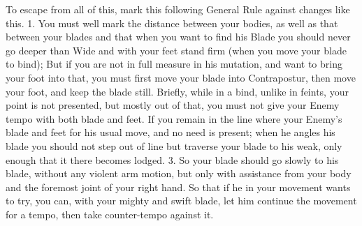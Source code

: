 To escape from all of this, mark this following General Rule against
changes like this. 1. You must well mark the distance between your
bodies, as well as that between your blades and that when you want to
find his Blade you should never go deeper than Wide and with your feet
stand firm (when you move your blade to bind); But if you are not in
full measure in his mutation, and want to bring your foot into that,
you must first move your blade into Contrapostur, then move your foot,
and keep the blade still. Briefly, while in a bind, unlike in feints,
your point is not presented, but mostly out of that, you must not give
your Enemy tempo with both blade and feet. If you remain in the line
where your Enemy's blade and feet for his usual move, and no need is
present; when he angles his blade you should not step out of line but
traverse your blade to his weak, only enough that it there becomes
lodged. 3. So your blade should go slowly to his blade, without any
violent arm motion, but only with assistance from your body and the
foremost joint of your right hand. So that if he in your movement
wants to try, you can, with your mighty and swift blade, let him
continue the movement for a tempo, then take counter-tempo against it.
